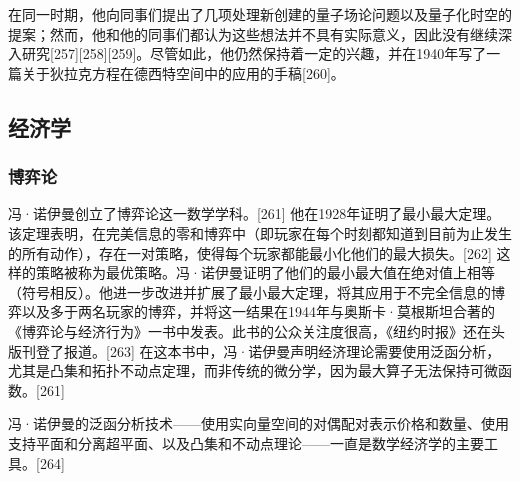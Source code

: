 在同一时期，他向同事们提出了几项处理新创建的量子场论问题以及量子化时空的提案；然而，他和他的同事们都认为这些想法并不具有实际意义，因此没有继续深入研究[257][258][259]。尽管如此，他仍然保持着一定的兴趣，并在1940年写了一篇关于狄拉克方程在德西特空间中的应用的手稿[260]。
\subsection{经济学}  
\subsubsection{博弈论}  
冯·诺伊曼创立了博弈论这一数学学科。[261] 他在1928年证明了最小最大定理。该定理表明，在完美信息的零和博弈中（即玩家在每个时刻都知道到目前为止发生的所有动作），存在一对策略，使得每个玩家都能最小化他们的最大损失。[262] 这样的策略被称为最优策略。冯·诺伊曼证明了他们的最小最大值在绝对值上相等（符号相反）。他进一步改进并扩展了最小最大定理，将其应用于不完全信息的博弈以及多于两名玩家的博弈，并将这一结果在1944年与奥斯卡·莫根斯坦合著的《博弈论与经济行为》一书中发表。此书的公众关注度很高，《纽约时报》还在头版刊登了报道。[263] 在这本书中，冯·诺伊曼声明经济理论需要使用泛函分析，尤其是凸集和拓扑不动点定理，而非传统的微分学，因为最大算子无法保持可微函数。[261]

冯·诺伊曼的泛函分析技术——使用实向量空间的对偶配对表示价格和数量、使用支持平面和分离超平面、以及凸集和不动点理论——一直是数学经济学的主要工具。[264]